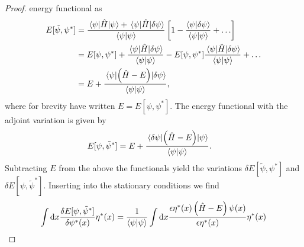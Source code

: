 \begin{proof}
            energy functional as
            \begin{align}
                E[\tilde{\psi}, \psi^{*}]
                &= \frac{
                    \mel{\psi}{\hamil}{\psi}
                    + \mel{\psi}{\hamil}{\delta\psi}
                }{
                    \braket{\psi}
                }\brak{
                    1 - \frac{\braket{\psi}{\delta\psi}}{\braket{\psi}}
                    + \dots
                }
                \\
                &=
                E[\psi, \psi^{*}]
                + \frac{
                    \mel{\psi}{\hamil}{\delta\psi}
                }{
                    \braket{\psi}
                }
                - E[\psi, \psi^{*}]
                \frac{
                    \mel{\psi}{\hamil}{\delta\psi}
                }{
                    \braket{\psi}
                }
                + \dots
                \\
                &=
                E + \frac{
                    \mel{\psi}{\para{\hamil - E}}{\delta\psi}
                }{
                    \braket{\psi}
                },
            \end{align}
            where for brevity have written $E = E[\psi, \psi^{*}]$.
            The energy functional with the adjoint variation is given by
            \begin{align}
                E[\psi, \tilde{\psi}^{*}]
                &=
                E + \frac{
                    \mel{\delta\psi}{\left( \hat{H}- E \right)}{\psi}
                }{
                    \braket{\psi}
                }.
            \end{align}
            Subtracting $E$ from the above the functionals yield the variations
            $\delta E[\tilde{\psi}, \psi^{*}]$ and $\delta E[\psi,
            \tilde{\psi}^{*}]$.
            Inserting into the stationary conditions we find
            \begin{align}
                \int\dd x
                \frac{
                    \delta E[\psi, \tilde{\psi}^{*}]
                }{
                    \delta\psi^{*}(x)
                }\eta^{*}(x)
                &=
                \frac{1}{\braket{\psi}}
                \int\dd x
                \frac{
                    \epsilon\eta^{*}(x)\para{
                        \hamil
                        - E
                    }
                    \psi(x)
                }{
                    \epsilon\eta^{*}(x)
                }
                \eta^{*}(x)
                \\

\end{align}
\end{proof}
